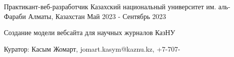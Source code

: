 

\begin{cventries}

  \cventry
    {Практикант-веб-разработчик} %
    {Казахский национальный университет им. аль-Фараби} %
    {Алматы, Казахстан} %
    {Май 2023 - Сентябрь 2023} %
    {
      \begin{cvitems} %
        \item {Создание модели вебсайта для научных журналов КазНУ}
        \item {Куратор: Касым Жомарт, jomart.kasym@kaznu.kz, +7-707-}
      \end{cvitems}
    }
\end{cventries}
